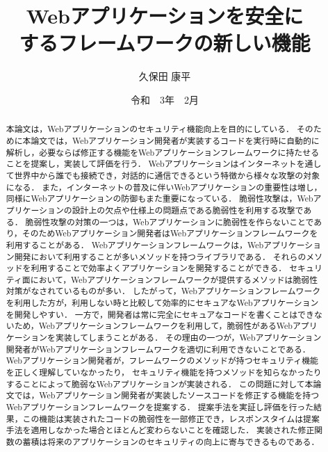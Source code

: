 \documentclass[a4paper,12pt]{jreport}
\title{Webアプリケーションを安全に\\するフレームワークの新しい機能}
\author{久保田 康平}
\date{令和　3年　2月}
\begin{document}
\maketitle

\begin{abstract}
本論文は，Webアプリケーションのセキュリティ機能向上を目的にしている．
そのために本論文では，Webアプリケーション開発者が実装するコードを実行時に自動的に解析し，必要ならば修正する機能をWebアプリケーションフレームワークに持たせることを提案し，実装して評価を行う．
Webアプリケーションはインターネットを通して世界中から誰でも接続でき，対話的に通信できるという特徴から様々な攻撃の対象になる．
また，インターネットの普及に伴いWebアプリケーションの重要性は増し，同様にWebアプリケーションの防御もまた重要になっている．
脆弱性攻撃は，Webアプリケーションの設計上の欠点や仕様上の問題点である脆弱性を利用する攻撃である．
脆弱性攻撃の対策の一つは，Webアプリケーションに脆弱性を作らないことであり，そのためWebアプリケーション開発者はWebアプリケーションフレームワークを利用することがある．
Webアプリケーションフレームワークは，Webアプリケーション開発において利用することが多いメソッドを持つライブラリである．
それらのメソッドを利用することで効率よくアプリケーションを開発することができる．
セキュリティ面において，Webアプリケーションフレームワークが提供するメソッドは脆弱性対策がなされているものが多い．
したがって，Webアプリケーションフレームワークを利用した方が，利用しない時と比較して効率的にセキュアなWebアプリケーションを開発しやすい．
一方で，開発者は常に完全にセキュアなコードを書くことはできないため，Webアプリケーションフレームワークを利用して，脆弱性があるWebアプリケーションを実装してしまうことがある．
その理由の一つが，Webアプリケーション開発者がWebアプリケーションフレームワークを適切に利用できないことである．
Webアプリケーション開発者が，フレームワークのメソッドが持つセキュリティ機能を正しく理解していなかったり，
セキュリティ機能を持つメソッドを知らなかったりすることによって脆弱なWebアプリケーションが実装される．
この問題に対して本論文では，Webアプリケーション開発者が実装したソースコードを修正する機能を持つWebアプリケーションフレームワークを提案する．
提案手法を実証し評価を行った結果，この機能は実装されたコードの脆弱性を一部修正でき，レスポンスタイムは提案手法を適用しなかった場合とほとんど変わらないことを確認した．
実装された修正関数の蓄積は将来のアプリケーションのセキュリティの向上に寄与できるものである．
\end{abstract}

\tableofcontents
\listoffigures
\listoftables
\newpage
{}
\end{document}
